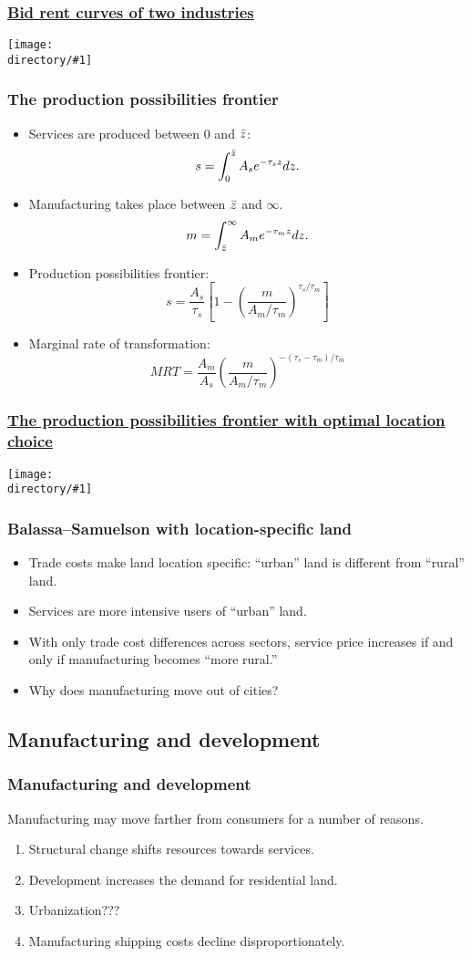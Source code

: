 \documentclass[compress,mathserif]{beamer}
\newcounter{perc}
\newcounter{percek}
\newcommand{\directory}{figures}
\newcommand{\widefigure}[2]{\begin{frame}\frametitle{\hyperlink{#1back}{#2}}\hypertarget{#1}{{\begin{center}\texttt{[image: \\directory/\#1]}\end{center}}}\end{frame}}
\renewcommand{\time}[1]{\addtocounter{percek}{#1}}
\begin{document}
\widefigure{bid-rent-2-exp}{Bid rent curves of two industries}
\time{3}

\begin{frame}\frametitle{The production possibilities frontier}
\begin{itemize}
\item Services are produced between $0$ and $\Bar z$:
\[
s = \int_0^{\Bar z}A_se^{-\tau_s z}dz.
\]
\item Manufacturing takes place between $\Bar z$ and $\infty$.
\[
m = \int_{\Bar z}^\infty A_me^{-\tau_m z}dz.
\]
\item Production possibilities frontier:
\[
s = \frac{A_s}{\tau_s}\left[1-\left(\frac{m}{A_m/\tau_m}\right)^{\tau_s/\tau_m}\right]
\]
\item Marginal rate of transformation:
\[
MRT = \frac{A_m}{A_s}\left(\frac{m}{A_m/\tau_m}\right)^{-(\tau_s-\tau_m)/\tau_m}
\]
\end{itemize}
\end{frame}

\widefigure{PPF-location}{The production possibilities frontier with optimal location choice}


\begin{frame}\frametitle{Balassa--Samuelson with location-specific land}
\begin{itemize}
\item Trade costs make land location specific: ``urban'' land is different from ``rural'' land.
\item Services are more intensive users of ``urban'' land.
\item With only trade cost differences across sectors, service price increases if and only if manufacturing becomes ``more rural.''
\item Why does manufacturing move out of cities?
\end{itemize}
\end{frame}

\subsection{Manufacturing and development}

\begin{frame}\frametitle{Manufacturing and development}
Manufacturing may move farther from consumers for a number of reasons.
\begin{enumerate}
\item Structural change shifts resources towards services.
\item Development increases the demand for residential land.
\item Urbanization???
\item Manufacturing shipping costs decline disproportionately.
\end{enumerate}
\end{frame}
\time 1
\end{document}
